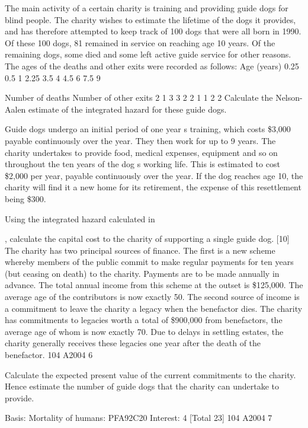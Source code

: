\documentclass[a4paper,12pt]{article}
\begin{document}
The main activity of a certain charity is training and providing guide dogs for blind
people. The charity wishes to estimate the lifetime of the dogs it provides, and has
therefore attempted to keep track of 100 dogs that were all born in 1990. Of these 100
dogs, 81 remained in service on reaching age 10 years. Of the remaining dogs, some
died and some left active guide service for other reasons.
The ages of the deaths and other exits were recorded as follows:
Age
(years)
0.25
0.5
1
2.25
3.5
4
4.5
6
7.5
9
\item 
Number
of deaths
Number
of other exits
2
1
3
3
2
2
1
1
2
2
Calculate the Nelson-Aalen estimate of the integrated hazard for these guide
dogs.

Guide dogs undergo an initial period of one year s training, which costs \$3,000
payable continuously over the year. They then work for up to 9 years. The charity
undertakes to provide food, medical expenses, equipment and so on throughout the
ten years of the dog s working life. This is estimated to cost \$2,000 per year, payable
continuously over the year. If the dog reaches age 10, the charity will find it a new
home for its retirement, the expense of this resettlement being \$300.
\item 
Using the integrated hazard calculated in \item , calculate the capital cost to the
charity of supporting a single guide dog.
[10]
The charity has two principal sources of finance. The first is a new scheme whereby
members of the public commit to make regular payments for ten years (but ceasing on
death) to the charity. Payments are to be made annually in advance. The total annual
income from this scheme at the outset is \$125,000. The average age of the
contributors is now exactly 50.
The second source of income is a commitment to leave the charity a legacy when the
benefactor dies. The charity has commitments to legacies worth a total of \$900,000
from benefactors, the average age of whom is now exactly 70. Due to delays in
settling estates, the charity generally receives these legacies one year after the death of
the benefactor.
104 A2004
6\item 
Calculate the expected present value of the current commitments to the
charity. Hence estimate the number of guide dogs that the charity can
undertake to provide.

Basis: Mortality of humans: PFA92C20
Interest:
4%
[Total 23]
104 A2004
7
\end{document}
